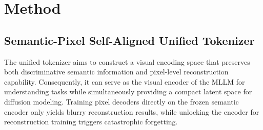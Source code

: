 \documentclass[runningheads]{llncs}
\begin{document}

\section{Method}
\subsection{Semantic-Pixel Self-Aligned Unified Tokenizer}
The unified tokenizer aims to construct a visual encoding space that preserves both discriminative semantic information and pixel-level reconstruction capability. Consequently, it can serve as the visual encoder of the MLLM for understanding tasks while simultaneously providing a compact latent space for diffusion modeling.
Training pixel decoders directly on the frozen semantic encoder only yields blurry reconstruction results, while unlocking the encoder for reconstruction training triggers catastrophic forgetting.
\end{document}
